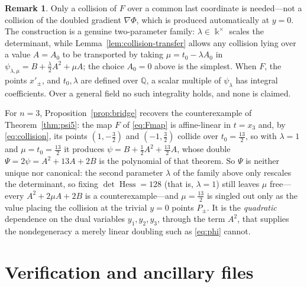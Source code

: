 \documentclass[11pt]{article}
\theoremstyle{plain}
\theoremstyle{definition}
\newtheorem{remark}[theorem]{Remark}
\newcommand{\Q}{\mathbb{Q}}
\newcommand{\kk}{\Bbbk}
\newcommand{\Hess}{\operatorname{Hess}}
\begin{document}
\begin{remark}
Only a collision of $F$ over a common last coordinate is needed---not a
collision of the doubled gradient $\nabla\Phi$, which is produced
automatically at $y=0$. The construction is a genuine two-parameter
family: $\lambda\in\kk^{\times}$ scales the determinant, while
Lemma~\ref{lem:collision-transfer} allows any collision lying over a value
$A=A_0$ to be transported by taking $\mu=t_0-\lambda A_0$ in
$\psi_{\lambda,\mu}=B+\tfrac{\lambda}{2}A^2+\mu A$; the choice $A_0=0$
above is the simplest. When $F$, the points $x'_\pm$, and $t_0,\lambda$
are defined over $\Q$, a scalar multiple of $\psi_\lambda$ has integral
coefficients. Over a general field no such integrality holds, and none is
claimed.
\end{remark}

For $n=3$, Proposition~\ref{prop:bridge} recovers the counterexample of
Theorem~\ref{thm:psi5}: the map $F$ of \eqref{eq:Fmap} is affine-linear
in $t=x_3$ and, by \eqref{eq:collision}, its points $(1,-\tfrac32)$ and
$(-1,\tfrac32)$ collide over $t_0=\tfrac{13}2$, so with $\lambda=1$ and
$\mu=t_0=\tfrac{13}2$ it produces $\psi=B+\tfrac12A^2+\tfrac{13}2A$, whose
double $\Psi=2\psi=A^2+13A+2B$ is the polynomial of that
theorem. So $\Psi$ is neither unique nor canonical: the second
parameter $\lambda$ of the family above only rescales the determinant, so
fixing $\det\Hess=128$ (that is, $\lambda=1$) still leaves $\mu$ free---%
every $A^2+2\mu A+2B$ is a counterexample---and $\mu=\tfrac{13}2$ is
singled out only as the value placing the collision at the trivial $y=0$
points $P_\pm$. It is the
\emph{quadratic} dependence on the dual variables $y_1,y_2,y_3$, through
the term $A^2$, that supplies the nondegeneracy a merely linear doubling
such as \eqref{eq:phi} cannot.

\section{Verification and ancillary files}
\label{app:computations}
\end{document}

